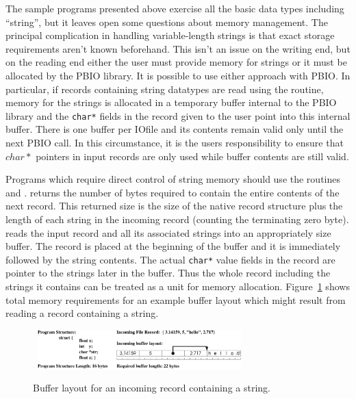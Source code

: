 The sample programs presented above exercise all the basic data types
including ``string'', but it leaves open some questions about memory
management.  The principal complication in handling variable-length strings
is that exact storage requirements aren't known beforehand.  This isn't an
issue on the writing end, but on the reading end either the user must
provide memory for strings or it must be allocated by the PBIO library.  It
is possible to use either approach with PBIO.  In particular, if records
containing string datatypes are read using the 
routine, memory for the strings is allocated in a temporary buffer internal
to the PBIO library and the {\tt char*} fields in the record given to the
user point into this internal buffer.  There is one buffer per IOfile and
its contents remain valid only until the next PBIO call.  In this
circumstance, it is the users responsibility to ensure that $char*$ pointers
in input records are only used while buffer contents are still valid.

Programs which require direct control of string memory should use the
routines  and
.  
returns the number of bytes required to contain the entire contents of the
next record.  This returned size is the size of the native record structure
plus the length of each string in the incoming record (counting the
terminating zero byte).   reads the
input record and all its associated strings into an appropriately size
buffer.  The record is placed at the beginning of the buffer and it is
immediately followed by the string contents.  The actual {\tt char*} value
fields in the record are pointer to the strings later in the buffer.  Thus
the whole record including the strings it contains can be treated as a unit
for memory allocation.  Figure~\ref{string_mem} shows total memory
requirements for an example buffer layout which might result from reading a
record containing a string.
\begin{figure}[tb]
\begin{center}\
\includegraphics[width=0.7\textwidth]{string_mem.pdf}
\caption{Buffer layout for an incoming record containing a
string.\label{string_mem}} 
\end{center}
\end{figure}
